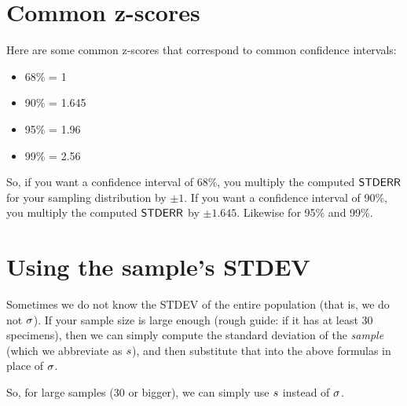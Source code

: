 \documentclass[../../../main.tex]{subfiles}
\begin{document}
\section{Common z-scores}

Here are some common z-scores that correspond to common confidence intervals:

\begin{itemize}
  \item 68\% = 1
  \item 90\% = 1.645
  \item 95\% = 1.96
  \item 99\% = 2.56
\end{itemize}

\noindent
So, if you want a confidence interval of 68\%, you multiply the computed $\StdErr/$ for your sampling distribution by $\pm 1$. If you want a confidence interval of 90\%, you multiply the computed $\StdErr/$ by $\pm 1.645$. Likewise for 95\% and 99\%.


\section{Using the sample's STDEV}

Sometimes we do not know the STDEV of the entire population (that is, we do not $\sigma$). If your sample size is large enough (rough guide: if it has at least 30 specimens), then we can simply compute the standard deviation of the \emph{sample} (which we abbreviate as $s$), and then substitute that into the above formulas in place of $\sigma$. 

So, for large samples (30 or bigger), we can simply use $s$ instead of $\sigma$.
\end{document}
